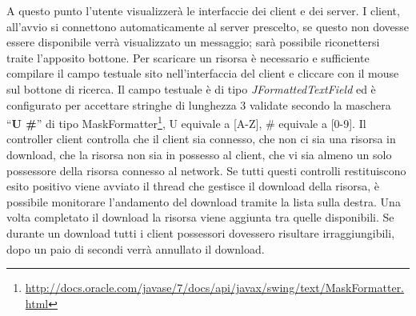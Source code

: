 \documentclass[
10pt, %
a4paper, %
oneside, %
BCOR5mm, %
]{scrartcl}
\begin{document}
	A questo punto l'utente visualizzerà le interfaccie dei client e dei server. I client, all'avvio si connettono automaticamente al server prescelto, se questo non dovesse essere disponibile verrà visualizzato un messaggio; sarà possibile riconettersi traite l'apposito bottone.
	Per scaricare un risorsa è necessario e sufficiente compilare il campo testuale sito nell'interfaccia del client e cliccare con il mouse sul bottone di ricerca. Il campo testuale è di tipo \emph{JFormattedTextField} ed è configurato per accettare stringhe di lunghezza 3 validate secondo la maschera ``\textbf{U \#}''  di tipo  MaskFormatter\footnote{\href{http://docs.oracle.com/javase/7/docs/api/javax/swing/text/MaskFormatter.html}{http://docs.oracle.com/javase/7/docs/api/javax/swing/text/MaskFormatter.html}}, U equivale a [A-Z], \# equivale a [0-9].
	Il controller client controlla che il client sia connesso, che non ci sia una risorsa in download, che la risorsa non sia in possesso al client, che vi sia almeno un solo possessore della risorsa connesso al network. Se tutti questi controlli restituiscono esito positivo viene avviato il thread che gestisce il download della risorsa, è possibile monitorare l'andamento del download tramite la lista sulla destra. Una volta completato il download la risorsa viene aggiunta tra quelle disponibili. Se durante un download tutti i client possessori dovessero risultare irraggiungibili, dopo un paio di secondi verrà annullato il download.
\end{document}
